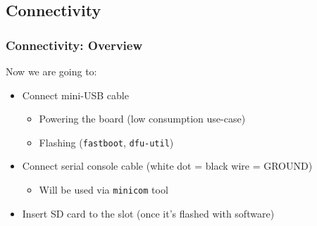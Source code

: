 \documentclass[aspectratio=169]{beamer}
\begin{document}
\subsection{Connectivity}

\begin{frame}
  \frametitle{Connectivity: Overview}

  \alert{Now we are going to:}

  \begin{itemize}
  \item Connect mini-USB cable
    \begin{itemize}
    \item Powering the board (low consumption use-case)
    \item Flashing (\texttt{fastboot}, \texttt{dfu-util})
    \end{itemize}
  \item Connect serial console cable (white dot = black wire = GROUND)
    \begin{itemize}
    \item Will be used via \texttt{minicom} tool
    \end{itemize}
  \item Insert SD card to the slot (once it's flashed with software)
  \end{itemize}
\end{frame}
\end{document}
